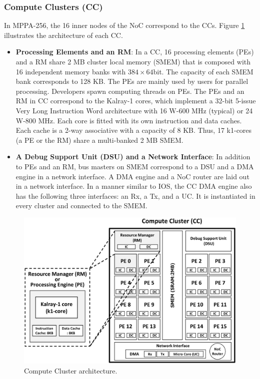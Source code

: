 \documentclass{sig-alternate-05-2015}
\begin{document}
\subsubsection{Compute Clusters (CC)}
\label{sec:cc}
In MPPA-256, the 16 inner nodes of the NoC correspond to the CCs.
Figure \ref{fig:cc_architecture} illustrates the architecture of each CC.

\begin{itemize}
\item \textbf{Processing Elements and an RM}:
In a CC, 16 processing elements (PEs) and a RM share 2 MB cluster local memory (SMEM) that is composed with 16 independent memory banks with $384\times 64 $bit.
The capacity of each SMEM bank corresponds to 128 KB.
The PEs are mainly used by users for parallel processing.
Developers spawn computing threads on PEs.
The PEs and an RM in CC correspond to the Kalray-1 cores, which implement a 32-bit 5-issue Very Long Instruction Word architecture with 16 W-600 MHz (typical) or 24 W-800 MHz.
Each core is fitted with its own instruction and data caches.
Each cache is a 2-way associative with a capacity of 8 KB.
Thus, 17 k1-cores (a PE or the RM) share a multi-banked 2 MB SMEM.

\item \textbf{A Debug Support Unit (DSU) and a Network Interface}:
In addition to PEs and an RM, bus masters on SMEM correspond to a DSU and a DMA engine in a network interface.
A DMA engine and a NoC router are laid out in a network interface.
In a manner similar to IOS, the CC DMA engine also has the following three interfaces: an Rx, a Tx, and a UC. 
It is instantiated in every cluster and connected to the SMEM.
\end{itemize}

\begin{figure}[t]
  \centering
  \includegraphics[width=1.0\linewidth]{../figure/cc_architecture.eps}
  \caption{\label{fig:cc_architecture}
    Compute Cluster architecture.}
\end{figure}
\end{document}
